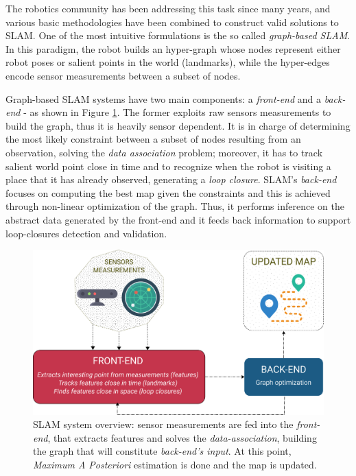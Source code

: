 \documentclass[10pt,a4paper, notitlepage]{report}
\begin{document}
The robotics community has been addressing this task since many years, and various basic methodologies have been combined to construct valid solutions to SLAM. One of the most intuitive formulations is the so called \textit{graph-based SLAM}\cite{lu1997globally}. In this paradigm, the robot builds an hyper-graph whose nodes represent either robot poses or salient points in the world (landmarks), while the hyper-edges encode sensor measurements between a subset of nodes. 

Graph-based SLAM systems have two main components: a \textit{front-end} and a \textit{back-end} - as shown in Figure \ref{fig:slam-overview}. The former exploits raw sensors measurements to build the graph, thus it is heavily sensor dependent. It is in charge of determining the most likely constraint between a subset of nodes resulting from an observation, solving the \textit{data association} problem; moreover, it has to track salient world point close in time and to recognize when the robot is visiting a place that it has already observed, generating a \textit{loop closure}. SLAM's \textit{back-end} focuses on computing the best map given the constraints and this is achieved through non-linear optimization of the graph. Thus, it performs inference on the abstract data generated by the front-end and it feeds back information to support loop-closures detection and validation.

\begin{figure}[h]
    \centering
    \includegraphics[width=0.9\linewidth]{media/slam_system_mod.png}
    \caption{SLAM system overview: sensor measurements are fed into the \textit{front-end}, that extracts features and solves the \textit{data-association}, building the graph that will constitute \textit{back-end's input}. At this point, \textit{Maximum A Posteriori} estimation is done and the map is updated.}
    \label{fig:slam-overview}
\end{figure}
\end{document}
